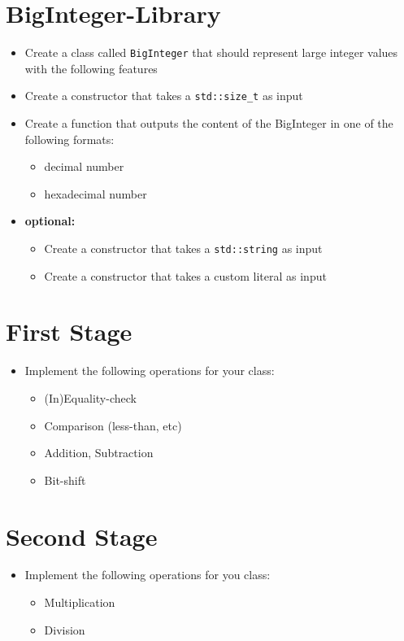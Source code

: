 \documentclass[12pt, a4paper]{article}
\begin{document}
\section*{BigInteger-Library}
\begin{itemize}
    \item Create a class called \lstinline{BigInteger} that should represent large integer values with the following features
    \item Create a constructor that takes a \lstinline{std::size_t} as input
    \item Create a function that outputs the content of the BigInteger in one of the following formats:
    \begin{itemize}
        \item decimal number
        \item hexadecimal number
    \end{itemize}
    \item \textbf{optional:}
    \begin{itemize}
        \item Create a constructor that takes a \lstinline{std::string} as input
        \item Create a constructor that takes a custom literal as input
    \end{itemize}
\end{itemize}
\section*{First Stage}
\begin{itemize}
    \item Implement the following operations for your class:
    \begin{itemize}
        \item (In)Equality-check
        \item Comparison (less-than, etc)
        \item Addition, Subtraction
        \item Bit-shift
    \end{itemize}
\end{itemize}
\section*{Second Stage}
\begin{itemize}
    \item Implement the following operations for you class:
    \begin{itemize}
        \item Multiplication
        \item Division
    \end{itemize}
\end{itemize}
\end{document}
